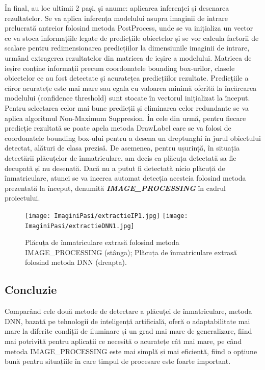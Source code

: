\documentclass[12pt]{article}
\begin{document}
\^{I}n final, au loc ultimii 2 pași, și anume: aplicarea inferenței și desenarea rezultatelor. Se va aplica inferența modelului asupra imaginii de intrare prelucrat\u{a} antreior folosind metoda PostProcess, unde se va inițializa un vector ce va stoca informațiile legate de predicțiile obiectelor și se vor calcula factorii de scalare pentru redimensionarea predicțiilor la dimensiunile imaginii de intrare, urm\^{a}nd extragerea rezultatelor din matricea de ieșire a modelului. Matricea de ieșire conține informații precum coordonatele bounding box-urilor, clasele obiectelor ce au fost detectate și acuratețea predicțiilor rezultate. Predicțiile a c\u{a}ror acuratețe este mai mare sau egala cu valoarea minim\u{a} oferit\u{a} la \^{i}nc\u{a}rcarea modelului (confidence threshold) sunt stocate \^{i}n vectorul inițializat la \^{i}nceput. Pentru selectarea celor mai bune predicții și eliminarea celor redundante se va aplica algoritmul Non-Maximum Suppresion. \^{I}n cele din urm\u{a}, pentru fiecare predicție rezultat\u{a} se poate apela metoda DrawLabel care se va folosi de coordonatele bounding box-ului pentru a desena un dreptunghi \^{i}n jurul obiectului detectat, al\u{a}turi de clasa prezis\u{a}. De asemenea, pentru ușurinț\u{a}, \^{i}n situația detect\u{a}rii pl\u{a}cuțelor de \^{i}nmatriculare, am decis ca pl\u{a}cuța detectat\u{a} sa fie decupat\u{a} și nu desenat\u{a}. Dac\u{a} nu a putut fi detectat\u{a} nicio pl\u{a}cuț\u{a} de \^{i}nmatriculare, atunci se va incerca automat detecția acesteia folosind metoda prezentat\u{a} la \^{i}nceput, denumit\u{a} \textbf{\textit{IMAGE\_PROCESSING}} \^{i}n cadrul proiectului.

\begin{figure}[H]
  \centering
  \texttt{[image: ImaginiPasi/extractieIP1.jpg]}\hfill
    \texttt{[image: ImaginiPasi/extractieDNN1.jpg]}
  \caption{Pl\u{a}cuța de \^{i}nmatriculare extras\u{a} folosind metoda IMAGE\_PROCESSING (st\^{a}nga); Pl\u{a}cuța de \^{i}nmatriculare extras\u{a} folosind metoda DNN (dreapta).}
  \label{fig:extractie_dnn}
\end{figure}

\subsection{Concluzie}

Compar\^{a}nd cele dou\u{a} metode de detectare a pl\u{a}cuței de \^{i}nmatriculare, metoda DNN, bazat\u{a} pe tehnologii de inteligenț\u{a} artificial\u{a}, ofer\u{a} o adaptabilitate mai mare la diferite condiții de iluminare și un grad mai mare de generalizare, fiind mai potrivit\u{a} pentru aplicații ce necesit\u{a} o acuratețe c\^{a}t mai mare, pe c\^{a}nd metoda IMAGE\_PROCESSING este mai simpl\u{a} și mai eficient\u{a}, fiind o opțiune bun\u{a} pentru situațiile \^{i}n care timpul de procesare este foarte important. 
\end{document}
